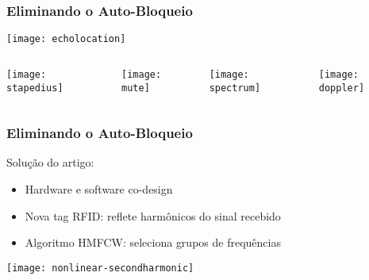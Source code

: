 \begin{frame}
    \frametitle{Eliminando o Auto-Bloqueio}

    \begin{center}
        \texttt{[image: echolocation]}
    \end{center}

    \pause
    \begin{columns}[T,onlytextwidth]
        \begin{center}
            \texttt{[image: stapedius]}
        \end{center}

        \pause

        \begin{center}
            \vfill
            \texttt{[image: mute]}
        \end{center}

        \pause

        \begin{center}
            \texttt{[image: spectrum]}
        \end{center}

        \pause

        \begin{center}
            \texttt{[image: doppler]}
        \end{center}
    \end{columns}
\end{frame}

\begin{frame}
    \frametitle{Eliminando o Auto-Bloqueio}

    Solução do artigo:
    \begin{itemize}
        \item Hardware e software \alert{co-design}
        \item Nova tag RFID: \alert{reflete harmônicos} do sinal recebido
        \item Algoritmo HMFCW: seleciona \alert{grupos de frequências}
    \end{itemize}

    \pause

    \begin{center}
        \texttt{[image: nonlinear-secondharmonic]}
    \end{center}
\end{frame}

